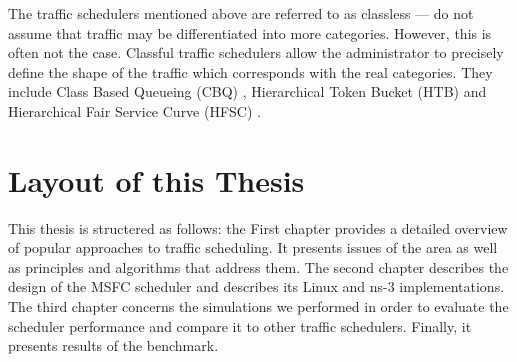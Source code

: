 The traffic schedulers mentioned above are referred to as classless --- do not assume that traffic may be differentiated into more categories. However, this is often not the case. Classful traffic schedulers allow the administrator to precisely define the shape of the traffic which corresponds with the real categories. They include Class Based Queueing (CBQ) \cite{CBQ}, Hierarchical Token Bucket (HTB) \cite{HTB} and Hierarchical Fair Service Curve (HFSC) \cite{HFSC}.

\section*{Layout of this Thesis}
This thesis is structered as follows: the First chapter provides a detailed overview of popular approaches to traffic scheduling. It presents issues of the area as well as principles and algorithms that address them. The second chapter describes the design of the MSFC scheduler and describes its Linux and ns-3 implementations. The third chapter concerns the simulations we performed in order to evaluate the scheduler performance and compare it to other traffic schedulers. Finally, it presents results of the benchmark.

